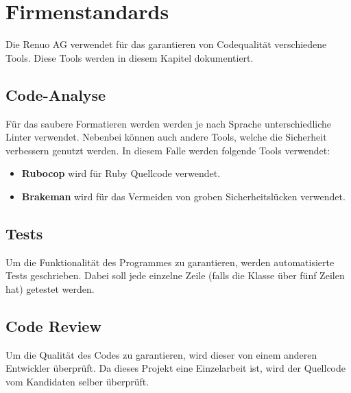 \chapter{Firmenstandards}
Die Renuo AG verwendet für das garantieren von Codequalität verschiedene Tools. Diese Tools werden in diesem Kapitel dokumentiert.

\section{Code-Analyse}
Für das saubere Formatieren werden werden je nach Sprache unterschiedliche \gls{Linter} verwendet. Nebenbei können auch andere Tools, welche die Sicherheit verbessern genutzt werden. In diesem Falle werden folgende Tools verwendet:

\begin{itemize}
    \item \textbf{Rubocop} wird für Ruby Quellcode verwendet.
    \item \textbf{Brakeman} wird für das Vermeiden von groben Sicherheitslücken verwendet.
\end{itemize}

\section{Tests}
Um die Funktionalität des Programmes zu garantieren, werden automatisierte Tests geschrieben. Dabei soll jede einzelne Zeile (falls die Klasse über fünf Zeilen hat) getestet werden.

\section{Code Review}
Um die Qualität des Codes zu garantieren, wird dieser von einem anderen Entwickler überprüft. Da dieses Projekt eine Einzelarbeit ist, wird der Quellcode vom Kandidaten selber überprüft.
